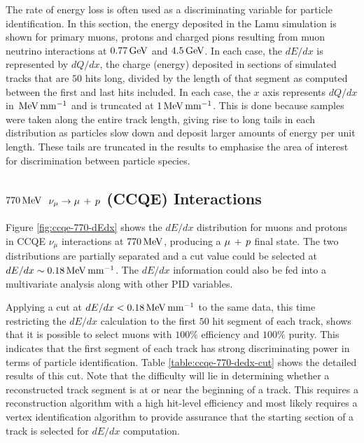 The rate of energy loss is often used as a discriminating variable for particle identification. In this section, the energy deposited in the Lamu simulation is shown for primary muons, protons and charged pions resulting from muon neutrino interactions at $0.77\,\mathrm{GeV}$ and $4.5\,\mathrm{GeV}$. In each case, the $dE/dx$ is represented by $dQ/dx$, the charge (energy) deposited in sections of simulated tracks that are $50$ hits long, divided by the length of that segment as computed between the first and last hits included. In each case, the $x$ axis represents $dQ/dx$ in $\,\mathrm{MeV} \,\mathrm{mm}^{-1}$ and is truncated at $1 \,\mathrm{MeV}\,\mathrm{mm}^{-1}$. This is done because samples were taken along the entire track length, giving rise to long tails in each distribution as particles slow down and deposit larger amounts of energy per unit length. These tails are truncated in the results to emphasise the area of interest for discrimination between particle species.

\subsection{$770\,\mathrm{MeV}$ \texorpdfstring{$\nu_\mu \rightarrow \mu\,+\,p$}{ν\_μ → μ + p} (CCQE) Interactions}
Figure \ref{fig:ccqe-770-dEdx} shows the $dE/dx$ distribution for muons and protons in \acs{CCQE} $\nu_\mu$ interactions at $770\,\mathrm{MeV}$, producing a $\mu\,+\,p$ final state. The two distributions are partially separated and a cut value could be selected at $dE/dx \sim 0.18 \,\mathrm{MeV}\,\mathrm{mm}^{-1}$. The $dE/dx$ information could also be fed into a multivariate analysis along with other \acs{PID} variables.

Applying a cut at $dE/dx < 0.18 \,\mathrm{MeV} \,\mathrm{mm}^{-1}$ to the same data, this time restricting the $dE/dx$ calculation to the first $50$ hit segment of each track, shows that it is possible to select muons with $100\%$ efficiency and $100\%$ purity. This indicates that the first segment of each track has strong discriminating power in terms of particle identification. Table \ref{table:ccqe-770-dedx-cut} shows the detailed results of this cut. Note that the difficulty will lie in determining whether a reconstructed track segment is at or near the beginning of a track. This requires a reconstruction algorithm with a high hit-level efficiency and most likely requires a vertex identification algorithm to provide assurance that the starting section of a track is selected for $dE/dx$ computation.

